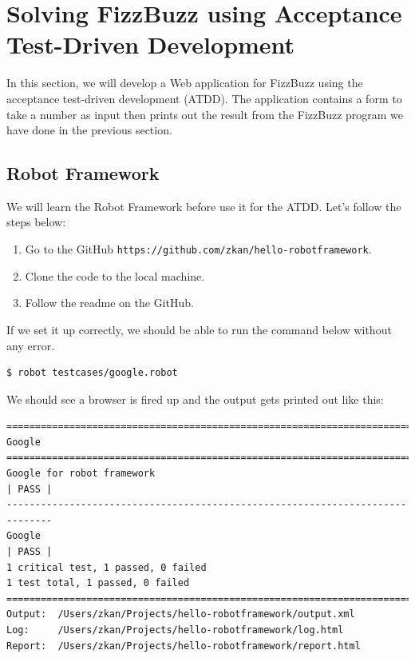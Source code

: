 \documentclass{article}
\begin{document}
\section*{Solving FizzBuzz using Acceptance Test-Driven Development}

\noindent In this section, we will develop a Web application for FizzBuzz using
the acceptance test-driven development (ATDD). The application contains a form
to take a number as input then prints out the result from the FizzBuzz program
we have done in the previous section.

\subsection*{Robot Framework}

\noindent We will learn the Robot Framework before use it for the ATDD. Let's
follow the steps below:

\begin{enumerate}
  \item Go to the GitHub {\tt https://github.com/zkan/hello-robotframework}.
  \item Clone the code to the local machine.
  \item Follow the readme on the GitHub.
\end{enumerate}

\noindent If we set it up correctly, we should be able to run the command below
without any error.

\begin{verbatim}
$ robot testcases/google.robot
\end{verbatim}

\noindent We should see a browser is fired up and the output gets printed out
like this:

\begin{verbatim}
==============================================================================
Google
==============================================================================
Google for robot framework                                            | PASS |
------------------------------------------------------------------------------
Google                                                                | PASS |
1 critical test, 1 passed, 0 failed
1 test total, 1 passed, 0 failed
==============================================================================
Output:  /Users/zkan/Projects/hello-robotframework/output.xml
Log:     /Users/zkan/Projects/hello-robotframework/log.html
Report:  /Users/zkan/Projects/hello-robotframework/report.html
\end{verbatim}
\end{document}
